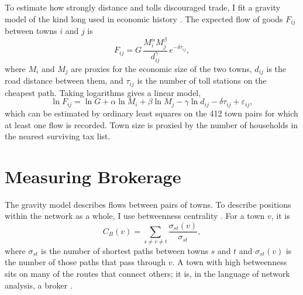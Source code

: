 To estimate how strongly distance and tolls discouraged trade, I fit a gravity model of the kind long used in economic history \parencite{tinbergen1962,chilosi2013}. The expected flow of goods $F_{ij}$ between towns $i$ and $j$ is
\begin{equation}
  F_{ij} = G \, \frac{M_i^{\alpha} M_j^{\beta}}{d_{ij}^{\gamma}} \, e^{-\delta \tau_{ij}},
  \label{eq:gravity}
\end{equation}
where $M_i$ and $M_j$ are proxies for the economic size of the two towns, $d_{ij}$ is the road distance between them, and $\tau_{ij}$ is the number of toll stations on the cheapest path. Taking logarithms gives a linear model,
\begin{equation}
  \ln F_{ij} = \ln G + \alpha \ln M_i + \beta \ln M_j - \gamma \ln d_{ij} - \delta \tau_{ij} + \varepsilon_{ij},
  \label{eq:loggravity}
\end{equation}
which can be estimated by ordinary least squares on the 412 town pairs for which at least one flow is recorded. Town size is proxied by the number of households in the nearest surviving tax list.

\section{Measuring Brokerage}

The gravity model describes flows between pairs of towns. To describe positions within the network as a whole, I use betweenness centrality \parencite{freeman1977}. For a town $v$, it is
\begin{equation}
  C_B(v) = \sum_{s \neq v \neq t} \frac{\sigma_{st}(v)}{\sigma_{st}},
  \label{eq:betweenness}
\end{equation}
where $\sigma_{st}$ is the number of shortest paths between towns $s$ and $t$ and $\sigma_{st}(v)$ is the number of those paths that pass through $v$. A town with high betweenness sits on many of the routes that connect others; it is, in the language of network analysis, a broker \parencite{padgett1993}.
